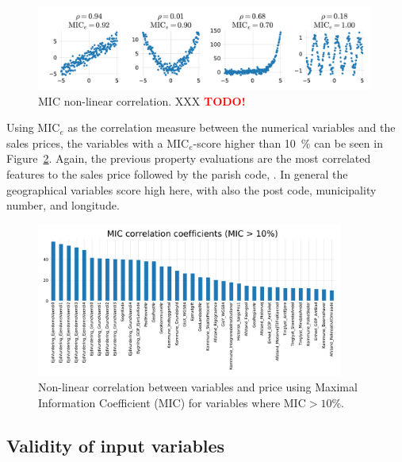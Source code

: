 \documentclass[a4paper, twoside, nobib]{tufte-book}
\newcommand{\code}[1]{\colorbox{light-gray}{\texttt{\detokenize{#1}}}}
\newcommand{\TODO}{\textcolor{red}{\bf TODO!}\xspace}
\begin{document}
\begin{figure}
  \centering
  \includegraphics[width=0.99\textwidth, trim=20 20 20 20, clip]{figures/housing/MIC_test_small.pdf}
  \caption[MIC non-linear correlation.]
          {MIC non-linear correlation. XXX \TODO}
  \label{fig:h:MIC_example_small}
\end{figure}

Using $\mathrm{MIC}_e$ as the correlation measure between the numerical variables and the sales prices, the variables with a $\mathrm{MIC}_e$-score higher than \SI{10}{\percent} can be seen in Figure~\ref{fig:h:corr_MIC}. Again, the previous property evaluations are the most correlated features to the sales price followed by the parish code, \code{SogneKode}. In general the geographical variables score high here, with also the post code, municipality number, and longitude. 

\begin{figure}
  \includegraphics[width=0.9\textwidth, trim=0 0 0 40, clip]{figures/housing/MIC_plot.pdf}
  \caption[Non-linear correlation between variables and price]
          {Non-linear correlation between variables and price using Maximal Information Coefficient (MIC) for variables where $\text{MIC}>10\%$.}
  \label{fig:h:corr_MIC}
\end{figure}

\subsection{Validity of input variables}
\end{document}
